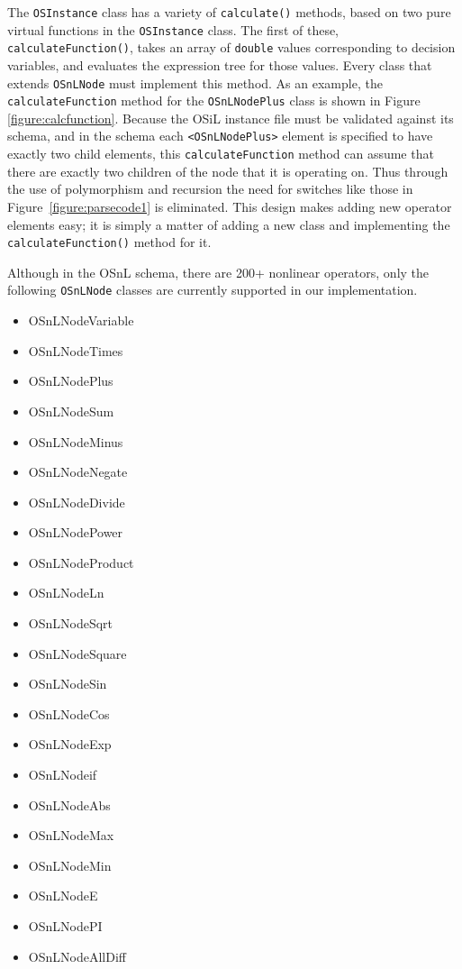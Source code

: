 \documentclass[11pt]{article}
\newcounter{Fig}
\renewcommand{\_}{{\char"5F}}
\renewcommand{\{}{{\char"7B}}
\renewcommand{\}}{{\char"7D}}
\renewcommand{\^}{{\char"0D}}
\renewcommand{\'}{{\char"0D}}
\begin{document}
    The {\tt OSInstance} class has a variety of {\tt calculate()} methods, based on two pure virtual functions in the {\tt OSInstance} class.  The first of these, {\tt calculateFunction()}, takes an array of {\tt double} values corresponding to decision variables, and evaluates the expression tree for those values.  Every class
that extends {\tt OSnLNode} must implement this method.  As an example, the {\tt calculateFunction} method for the {\tt OSnLNodePlus} class is shown in Figure \ref{figure:calcfunction}.  Because the OSiL instance file must be validated against its schema, and in the schema each {\tt <OSnLNodePlus>} element is specified to have exactly two child elements, this {\tt calculateFunction} method can assume that there are
exactly two children of the node that it is operating on.  Thus through the use of polymorphism and recursion the need for switches like those in Figure~\ref{figure:parsecode1} is eliminated. This design makes adding new operator elements easy; it is simply a matter of adding a new class and implementing the {\tt
calculateFunction()} method for it.



Although in the OSnL schema, there are 200+ nonlinear operators, only the following {\tt  OSnLNode} classes are currently supported in our implementation.

\begin{itemize}
\item OSnLNodeVariable
\item OSnLNodeTimes
\item OSnLNodePlus
\item OSnLNodeSum
\item OSnLNodeMinus
\item OSnLNodeNegate
\item OSnLNodeDivide
\item OSnLNodePower
\item OSnLNodeProduct
\item OSnLNodeLn
\item OSnLNodeSqrt
\item OSnLNodeSquare
\item OSnLNodeSin
\item OSnLNodeCos
\item OSnLNodeExp
\item OSnLNodeif
\item OSnLNodeAbs
\item OSnLNodeMax
\item OSnLNodeMin
\item OSnLNodeE
\item OSnLNodePI
\item OSnLNodeAllDiff
\end{itemize}
\end{document}
